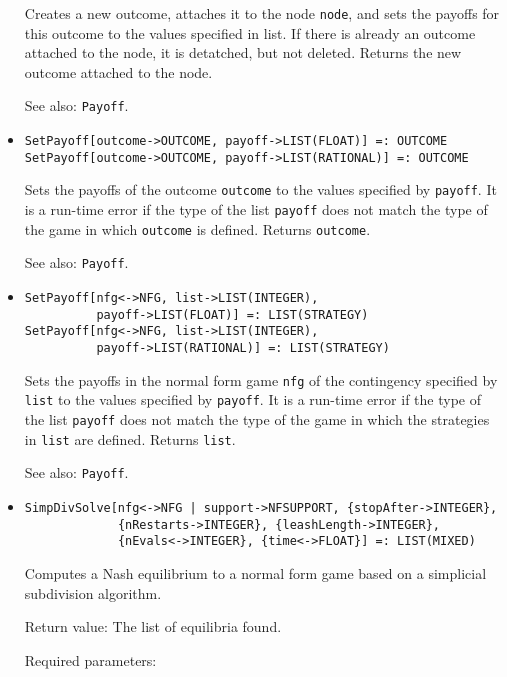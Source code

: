 \begin{itemize}
\bd
Creates a new outcome, attaches it to the node \verb+node+, and sets
the payoffs for this outcome to the values specified in list.  If
there is already an outcome attached to the node, it is detatched, but
not deleted.  Returns the new outcome attached to the node.  
\item
[See also:] {\tt Payoff}.
\ed

\item
\protect \large \begin{verbatim}
SetPayoff[outcome->OUTCOME, payoff->LIST(FLOAT)] =: OUTCOME
SetPayoff[outcome->OUTCOME, payoff->LIST(RATIONAL)] =: OUTCOME
\end{verbatim}\normalsize

\bd
Sets the payoffs of the outcome \verb+outcome+ to the
values specified by \verb+payoff+.  It is a run-time error if the type
of the list \verb+payoff+ does not match the type of the game in which
\verb+outcome+ is defined.  Returns \verb+outcome+.
\item
[See also:] {\tt Payoff}.
\ed

\item
\protect \large \begin{verbatim}
SetPayoff[nfg<->NFG, list->LIST(INTEGER),
          payoff->LIST(FLOAT)] =: LIST(STRATEGY)
SetPayoff[nfg<->NFG, list->LIST(INTEGER), 
          payoff->LIST(RATIONAL)] =: LIST(STRATEGY)
\end{verbatim}\normalsize

\bd
Sets the payoffs in the normal form game \verb+nfg+ of the
contingency specified by \verb+list+ to the values specified by
\verb+payoff+.  It is a run-time error if the type of the list
\verb+payoff+ does not match the type of the game in which the
strategies in \verb+list+ are defined.  Returns \verb+list+.
\item
[See also:] {\tt Payoff}.  
\ed

\item
\protect \large \begin{verbatim}
SimpDivSolve[nfg<->NFG | support->NFSUPPORT, {stopAfter->INTEGER}, 
             {nRestarts->INTEGER}, {leashLength->INTEGER},
             {nEvals<->INTEGER}, {time<->FLOAT}] =: LIST(MIXED)
\end{verbatim}\normalsize

\bd
Computes a Nash equilibrium to a normal form game based
on a simplicial subdivision algorithm.  

\item
[Return value:] The list of equilibria found.
\item
[Required parameters:]\hfil\null


\end{itemize}
